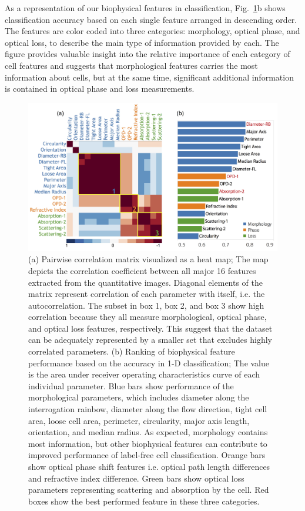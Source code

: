 \documentclass[aps,pra,reprint,longbibliography,superscriptaddress]{revtex4-1}
\begin{document}
As a representation of our biophysical features in classification, Fig.~\ref{fig:FeaturesCorrRank}b shows classification accuracy based on each single feature arranged in descending order. The features are color coded into three categories: morphology, optical phase, and optical loss, to describe the main type of information provided by each. The figure provides valuable insight into the relative importance of each category of cell features and suggests that morphological features carries the most information about cells, but at the same time, significant additional information is contained in optical phase and loss measurements. 

\begin{figure}
\includegraphics[scale=0.17]{FigureFeaturesCorrelationRank.jpg}
\caption{\label{fig:FeaturesCorrRank} (a) Pairwise correlation matrix visualized as a heat map; The map depicts the correlation coefficient between all major 16 features extracted from the quantitative images. Diagonal elements of the matrix represent correlation of each parameter with itself, i.e. the autocorrelation. The subset in box 1, box 2, and box 3 show high correlation because they all measure morphological, optical phase, and optical loss features, respectively. This suggest that the dataset can be adequately represented by a smaller set that excludes highly correlated parameters. (b) Ranking of biophysical feature performance based on the accuracy in 1-D classification; The value is the area under receiver operating characteristics curve of each individual parameter. Blue bars show performance of the morphological parameters, which includes diameter along the interrogation rainbow, diameter along the flow direction, tight cell area, loose cell area, perimeter, circularity, major axis length, orientation, and median radius. As expected, morphology contains most information, but other biophysical features can contribute to improved performance of label-free cell classification. Orange bars show optical phase shift features i.e. optical path length differences and refractive index difference. Green bars show optical loss parameters representing scattering and absorption by the cell. Red boxes show the best performed feature in these three categories.}
\end{figure}
\end{document}
